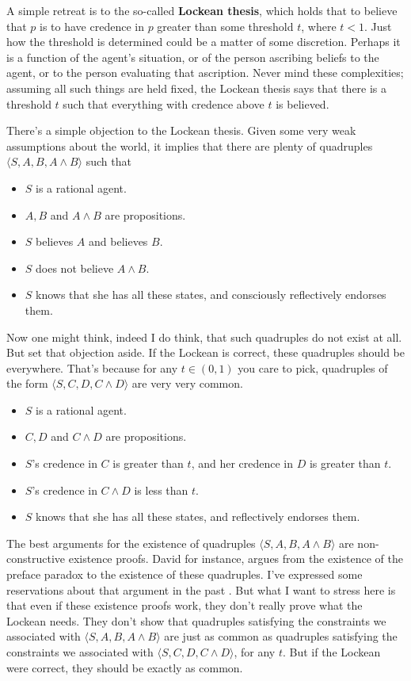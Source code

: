A simple retreat is to the so-called \textbf{Lockean thesis}, which holds that to believe that $p$ is to have credence in $p$ greater than some threshold $t$, where $t < 1$. Just how the threshold is determined could be a matter of some discretion. Perhaps it is a function of the agent's situation, or of the person ascribing beliefs to the agent, or to the person evaluating that ascription. Never mind these complexities; assuming all such things are held fixed, the Lockean thesis says that there is a threshold $t$ such that everything with credence above $t$ is believed.

There's a simple objection to the Lockean thesis. Given some very weak assumptions about the world, it implies that there are plenty of quadruples $\langle S, A, B, A \wedge B \rangle$ such that

\begin{itemize}
\item $S$ is a rational agent.
\item $A, B$ and $A \wedge B$ are propositions.
\item $S$ believes $A$ and believes $B$.
\item $S$ does not believe $A \wedge B$.
\item $S$ knows that she has all these states, and consciously reflectively endorses them.
\end{itemize}

\noindent Now one might think, indeed I do think, that such quadruples do not exist at all. But set that objection aside. If the Lockean is correct, these quadruples should be everywhere. That's because for any $t \in (0, 1) $ you care to pick, quadruples of the form $\langle S, C, D, C \wedge D \rangle$ are very very common.

\begin{itemize}
\item $S$ is a rational agent.
\item $C, D$ and $C \wedge D$ are propositions.
\item $S$'s credence in $C$ is greater than $t$, and her credence in $D$ is greater than $t$.
\item $S$'s credence in $C \wedge D$ is less than $t$.
\item $S$ knows that she has all these states, and reflectively endorses them.
\end{itemize}

\noindent The best arguments for the existence of quadruples $\langle S, A, B, A \wedge B \rangle$  are non-con\-structive existence proofs. David \citet{Christensen2005} for instance, argues from the existence of the preface paradox to the existence of these quadruples. I've expressed some reservations about that argument in the past \citep{Weatherson2005-WEACWD}. But what I want to stress here is that even if these existence proofs work, they don't really prove what the Lockean needs. They don't show that quadruples satisfying the constraints we associated with $\langle S, A, B, A \wedge B \rangle$ are just as common as quadruples satisfying the constraints we associated with $\langle S, C, D, C \wedge D \rangle$, for any $t$. But if the Lockean were correct, they should be exactly as common.

